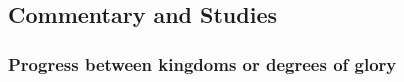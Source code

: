 	
	
	
	
\subsection{Commentary and Studies} %
	\label{KINGDOM-COMMENTARY}

	
		
	\subsubsection{Progress between kingdoms or degrees of glory}
		\label{KINGDOM-progress}
		
